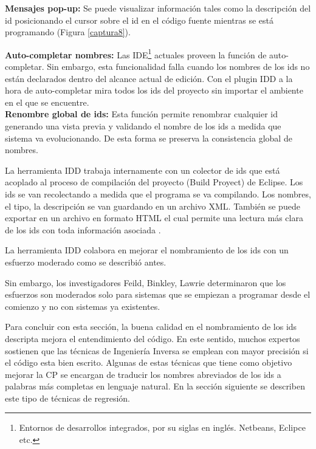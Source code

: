 \documentclass[a4paper,12pt]{report}
\begin{document}
\textbf{Mensajes pop-up:} Se puede visualizar información tales como la descripción del id posicionando el cursor sobre el id en el código fuente mientras se está programando (Figura \ref{captura8}).

\textbf{Auto-completar nombres:} Las IDE\footnote[2]{Entornos de desarrollos integrados, por su siglas en inglés. Netbeans, Eclipce etc.} actuales proveen la función de auto-completar.
Sin embargo, esta funcionalidad falla cuando los nombres de los ids no están declarados dentro del alcance actual de edición. Con el plugin IDD a la hora de auto-completar mira todos los ids del proyecto sin importar el ambiente en el que se encuentre.\\

\textbf{Renombre global de ids:} Esta función permite renombrar cualquier id generando una vista previa y validando el nombre de los ids a medida que sistema va evolucionando. De esta forma se preserva la consistencia global de nombres.

La herramienta IDD trabaja internamente con un colector de ids que está acoplado al proceso de compilación del proyecto (Build Proyect) de Eclipse. Los ids se van recolectando a medida que el programa se va compilando. Los nombres, el tipo, la descripción se van guardando en un archivo XML. También se puede exportar en un archivo en formato HTML el cual permite una lectura más clara de los ids con toda información asociada \cite{DFPM05}.



La herramienta IDD colabora en mejorar el nombramiento de los ids con un esfuerzo moderado como se describió antes. 

Sin embargo, los investigadores Feild, Binkley, Lawrie \cite{LFBEX07,DLHD06} determinaron que los esfuerzos son moderados solo para sistemas que se empiezan a programar desde el comienzo y no con sistemas ya existentes.

Para concluir con esta sección, la buena calidad en el nombramiento de los ids descripta mejora el entendimiento del código. En este sentido, muchos expertos sostienen que las técnicas de Ingeniería Inversa se emplean con mayor precisión si el código esta bien escrito. Algunas de estas técnicas que tiene como objetivo mejorar la CP se encargan de traducir los nombres abreviados de los ids a palabras más completas en lenguaje natural. En la sección siguiente se describen este tipo de técnicas de regresión.

\pagebreak
\end{document}
